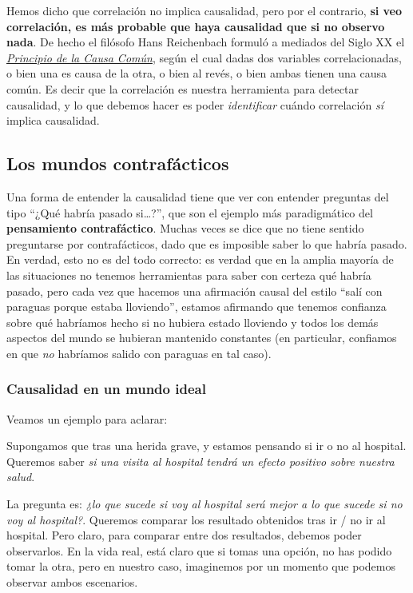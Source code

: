\documentclass[
  a4paper,
  DIV=11,
  numbers=noendperiod]{scrreprt}
\begin{document}
Hemos dicho que correlación no implica causalidad, pero por el
contrario, \textbf{si veo correlación, es más probable que haya
causalidad que si no observo nada}. De hecho el filósofo Hans
Reichenbach formuló a mediados del Siglo XX el
\href{https://plato.stanford.edu/entries/physics-Rpcc/}{\emph{Principio
de la Causa Común}}, según el cual dadas dos variables correlacionadas,
o bien una es causa de la otra, o bien al revés, o bien ambas tienen una
causa común. Es decir que la correlación es nuestra herramienta para
detectar causalidad, y lo que debemos hacer es poder \emph{identificar}
cuándo correlación \emph{sí} implica causalidad.

\subsection{Los mundos
contrafácticos}\label{los-mundos-contrafuxe1cticos}

Una forma de entender la causalidad tiene que ver con entender preguntas
del tipo ``¿Qué habría pasado si\ldots?'', que son el ejemplo más
paradigmático del \textbf{pensamiento contrafáctico}. Muchas veces se
dice que no tiene sentido preguntarse por contrafácticos, dado que es
imposible saber lo que habría pasado. En verdad, esto no es del todo
correcto: es verdad que en la amplia mayoría de las situaciones no
tenemos herramientas para saber con certeza qué habría pasado, pero cada
vez que hacemos una afirmación causal del estilo ``salí con paraguas
porque estaba lloviendo'', estamos afirmando que tenemos confianza sobre
qué habríamos hecho si no hubiera estado lloviendo y todos los demás
aspectos del mundo se hubieran mantenido constantes (en particular,
confiamos en que \emph{no} habríamos salido con paraguas en tal caso).

\subsubsection{Causalidad en un mundo
ideal}\label{causalidad-en-un-mundo-ideal}

Veamos un ejemplo para aclarar:

Supongamos que tras una herida grave, y estamos pensando si ir o no al
hospital. Queremos saber \emph{si una visita al hospital tendrá un
efecto positivo sobre nuestra salud}.

La pregunta es: \emph{¿lo que sucede si voy al hospital será mejor a lo
que sucede si no voy al hospital?}. Queremos comparar los resultado
obtenidos tras ir / no ir al hospital. Pero claro, para comparar entre
dos resultados, debemos poder observarlos. En la vida real, está claro
que si tomas una opción, no has podido tomar la otra, pero en nuestro
caso, imaginemos por un momento que podemos observar ambos escenarios.
\end{document}
